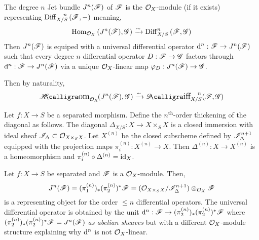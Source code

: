 \documentclass[12pt]{article}
\begin{document}
\begin{defn}
The degree $n$ Jet bundle $J^n(\mathscr{F})$ of $\mathscr{F}$ is the $\mathcal{O}_{X}$-module (if it exists) representing $\mathrm{Diff}^{\quad n}_{X/S}\left( \mathscr{F}, - \right)$ meaning,
\[ \mathrm{Hom}_{\mathcal{O}_{X}} \left( J^n(\mathscr{F}), \mathscr{G} \right) \xrightarrow{\sim} \mathrm{Diff}^{n}_{X/S}\left( \mathscr{F}, \mathscr{G} \right) \]
Then $J^n(\mathscr{F})$ is equiped with a universal differential operator $\mathrm{d}^n : \mathscr{F} \to J^n(\mathscr{F})$ such that every degree $n$ differential operator $D : \mathscr{F} \to \mathscr{G}$ factors through $\mathrm{d}^n : \mathscr{F} \to J^n(\mathscr{F})$ via a unique $\mathcal{O}_{X}$-linear map $\varphi_D : J^n(\mathscr{F}) \to \mathscr{G}$.
\end{defn}

\begin{rmk}
Then by naturality,
\[ \shHom{\struct{X}}{J^n(\F)}{\G} \iso \shDiff{n}{X/S}{\F}{\G} \]
\end{rmk}

\begin{defn}
Let $f : X \to S$ be a separated morphism. Define the $n^{\text{th}}$-order thickening of the diagonal as follows. The diagonal $\Delta_{X/S} : X \to X \times_S X$ is a closed immersion with ideal sheaf $\mathscr{I}_{\Delta} \subset \mathcal{O}_{X \times_S X}$. Let $X^{(n)}$ be the closed subscheme defined by $\mathscr{I}_{\Delta}^{n+1}$ equipped with the projection maps $\pi_i^{(n)} : X^{(n)} \to X$. Then $\Delta^{(n)} : X \to X^{(n)}$ is a homeomorphism and $\pi_i^{(n)} \circ \Delta^{(n)} = \mathrm{id}_X$.
\end{defn}

\begin{prop}
Let $f : X \to S$ be separated and $\mathscr{F}$ is a $\mathcal{O}_{X}$-module. Then,
\[ J^n(\mathscr{F}) = (\pi_1^{(n)})_* (\pi_2^{(n)})^* \mathscr{F} = (\mathcal{O}_{X \times_S X} / \mathscr{I}_\Delta^{n+1}) \otimes_{\mathcal{O}_{X}} \mathscr{F} \]
is a representing object for the order $\le n$ differential operators. The universal differential operator is obtained by the unit $\mathrm{d}^n : \mathscr{F} \to (\pi_2^{(n)})_* (\pi_2^{(n)})^* \mathscr{F}$ where $(\pi_2^{(n)})_* (\pi_2^{(n)})^* \mathscr{F} = J^n(\mathscr{F})$ \textit{as abelian sheaves} but with a different $\mathcal{O}_{X}$-module structure explaining why $\mathrm{d}^n$ is not $\mathcal{O}_{X}$-linear.
\end{prop}
\end{document}
